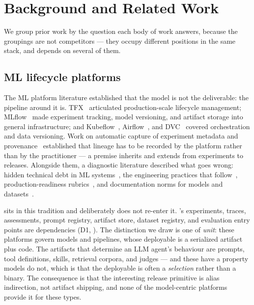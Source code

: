 \section{Background and Related Work}
\label{sec:background}

We group prior work by the question each body of work answers, because the
groupings are not competitors --- they occupy different positions in the same
stack, and \sys depends on several of them.

\subsection{ML lifecycle platforms}

The ML platform literature established that the model is not the deliverable: the
pipeline around it is. TFX~\cite{baylor2017tfx} articulated production-scale
lifecycle management; MLflow~\cite{zaharia2018mlflow} made experiment tracking,
model versioning, and artifact storage into general infrastructure; and
Kubeflow~\cite{kubeflow}, Airflow~\cite{airflow}, and DVC~\cite{dvc} covered
orchestration and data versioning. Work on automatic capture of experiment metadata and
provenance~\cite{schelter2017provenance} established that lineage has to be
recorded by the platform rather than by the practitioner --- a premise \sys inherits
and extends from experiments to releases. Alongside them, a diagnostic literature
described what goes wrong: hidden technical debt in ML
systems~\cite{sculley2015debt}, the engineering practices that
follow~\cite{amershi2019se4ml}, production-readiness rubrics~\cite{
breck2017mltest}, and documentation norms for models and
datasets~\cite{mitchell2019modelcards,gebru2021datasheets}.

\sys sits in this tradition and deliberately does not re-enter it. \mlflow{}'s
experiments, traces, assessments, prompt registry, artifact store, dataset
registry, and evaluation entry points are dependencies (D1,
). The distinction we draw is one of \emph{unit}: these
platforms govern models and pipelines, whose deployable is a serialized artifact
plus code. The artifacts that determine an LLM agent's behaviour are prompts, tool
definitions, skills, retrieval corpora, and judges --- and these have a property
models do not, which is that the deployable is often a \emph{selection} rather
than a binary. The consequence is that the interesting release primitive is alias
indirection, not artifact shipping, and none of the model-centric platforms
provide it for these types.

